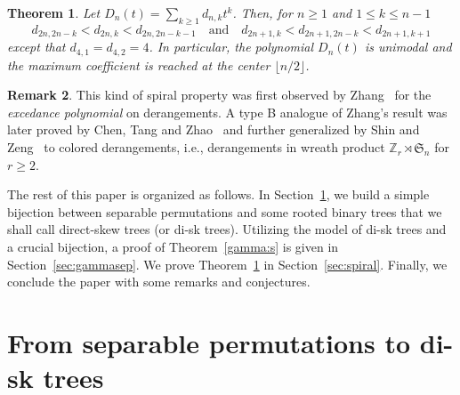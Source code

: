 \documentclass[12pt]{amsart}
\numberwithin{equation}{section}
\theoremstyle{plain}
\newtheorem{theorem}{Theorem}[section]
\theoremstyle{definition}
\newtheorem{remark}[theorem]{Remark}
\newcommand{\Z}{\mathbb{Z}}
\def\S{\mathfrak{S}}
\begin{document}
 
 \begin{theorem}\label{thm:spiral}
 Let $D_n(t)=\sum_{k\geq1}d_{n,k}t^k$. Then, for $n\geq1$ and $1\leq k\leq n-1$
 \begin{equation}\label{spiral}
 d_{2n,2n-k}< d_{2n,k}<d_{2n,2n-k-1}\quad\text{and}\quad
 d_{2n+1,k}< d_{2n+1,2n-k}< d_{2n+1,k+1}
 \end{equation}
  except that $d_{4,1}=d_{4,2}=4$. In particular, the polynomial $D_n(t)$ is unimodal and the maximum coefficient is reached 
  at the center $\lfloor n/2\rfloor$.
 \end{theorem}
\begin{remark}
This kind of spiral property was first observed by Zhang~\cite{zh} for 
the {\em excedance polynomial} on derangements.
 A type B analogue of Zhang's result  was later proved  by Chen, Tang and Zhao~\cite{ctz}  and further generalized by Shin and Zeng~\cite[Corollary 7]{sz} to colored derangements, i.e., derangements 
 in wreath product $\Z_r\rtimes \S_n$ for $r\geq 2$.
 \end{remark}
 
 

The rest of this paper is organized as follows. In Section~\ref{sec:spswdt}, we build a simple bijection between separable permutations and some rooted binary trees that we shall call direct-skew trees (or di-sk trees).  Utilizing the model of di-sk trees and a crucial bijection, a proof of Theorem~\ref{gamma:s} is given in Section~\ref{sec:gammasep}.  
We prove Theorem~\ref{thm:spiral} in Section~\ref{sec:spiral}. Finally, we conclude the paper with some remarks and conjectures.




\section{From separable permutations to di-sk trees}\label{sec:spswdt}
\end{document}
